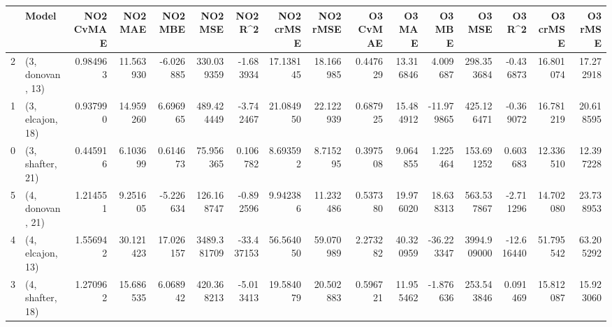 \begin{tabular}{llrrrrrrrrrrrrrr}
\toprule
{} &             Model &  NO2 CvMAE &    NO2 MAE &    NO2 MBE &      NO2 MSE &    NO2 R\textasciicircum2 &  NO2 crMSE &   NO2 rMSE &  O3 CvMAE &     O3 MAE &     O3 MBE &       O3 MSE &     O3 R\textasciicircum2 &   O3 crMSE &    O3 rMSE \\
\midrule
2 &  (3, donovan, 13) &   0.984963 &  11.563930 &  -6.026885 &   330.039359 &  -1.683934 &  17.138145 &  18.166985 &  0.447629 &  13.316846 &   4.009687 &   298.353684 &  -0.436873 &  16.801074 &  17.272918 \\
1 &  (3, elcajon, 18) &   0.937990 &  14.959260 &   6.696965 &   489.424449 &  -3.742467 &  21.084950 &  22.122939 &  0.687925 &  15.484912 & -11.979865 &   425.126471 &  -0.369072 &  16.781219 &  20.618595 \\
0 &  (3, shafter, 21) &   0.445916 &   6.103699 &   0.614673 &    75.956365 &   0.106782 &   8.693592 &   8.715295 &  0.397508 &   9.064855 &   1.225464 &   153.691252 &   0.603683 &  12.336510 &  12.397228 \\
5 &  (4, donovan, 21) &   1.214551 &   9.251605 &  -5.226634 &   126.168747 &  -0.892596 &   9.942386 &  11.232486 &  0.537380 &  19.976020 &  18.638313 &   563.537867 &  -2.711296 &  14.702080 &  23.738953 \\
4 &  (4, elcajon, 13) &   1.556942 &  30.121423 &  17.026157 &  3489.381709 & -33.437153 &  56.564050 &  59.070989 &  2.273282 &  40.320959 & -36.223347 &  3994.909000 & -12.616440 &  51.795542 &  63.205292 \\
3 &  (4, shafter, 18) &   1.270962 &  15.686535 &   6.068942 &   420.368213 &  -5.013413 &  19.584079 &  20.502883 &  0.596721 &  11.955462 &  -1.876636 &   253.543846 &   0.091469 &  15.812087 &  15.923060 \\
\bottomrule
\end{tabular}

